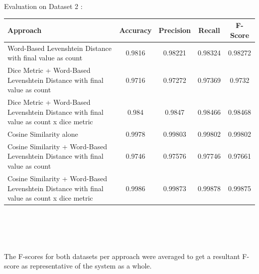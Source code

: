 \documentclass[12pt, a4paper]{article}
\begin{document}
\clearpage 
Evaluation on Dataset 2 : 
\begin{center}
  \renewcommand{\arraystretch}{1.5}
  \begin{tabular}{p{5.5cm}|c|c|c|c}
    Approach&Accuracy&Precision&Recall&F-Score \\ 
    \hline 
    Word-Based Levenshtein Distance with final value as count&0.9816&0.98221&0.98324&0.98272 \\ 
    Dice Metric + Word-Based Levenshtein Distance with final value as count&0.9716&0.97272&0.97369&0.9732 \\ 
    Dice Metric + Word-Based Levenshtein Distance with final value as count x dice metric&0.984&0.9847&0.98466&0.98468 \\ 
    Cosine Similarity alone&0.9978&0.99803&0.99802&0.99802 \\
    Cosine Similarity + Word-Based Levenshtein Distance with final value as count&0.9746&0.97576&0.97746&0.97661 \\
    Cosine Similarity + Word-Based Levenshtein Distance with final value as count x dice metric&0.9986&0.99873&0.99878&0.99875 \\ 
\end{tabular}
\end{center} 
\\~\\~\\~\\ 
The F-scores for both datasets per approach were averaged to get a resultant F-score as representative of the system as a whole. 
\end{document}

